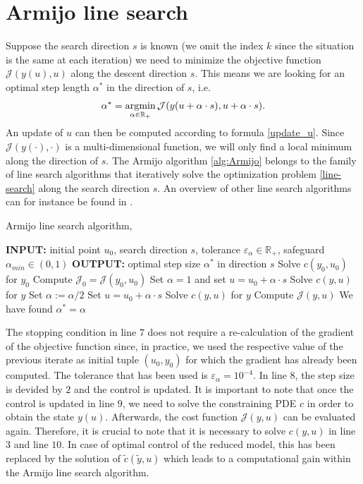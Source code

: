 \section{Armijo line search}
\label{Armapp}
Suppose the search direction $s$ is known (we omit the index $k$ since the situation is the same at each iteration) we need to minimize the objective function $\mathcal{J}(y(u),u)$ along the descent direction $s$. This means we are looking for an optimal step length $\alpha^*$ in the direction of $s$, i.e.
\begin{align}
\label{line-search}
\alpha^* = \operatorname*{\arg\!\min}_{\alpha \in \mathbb{R}_+} \mathcal{J}(y(u + \alpha \cdot s), u + \alpha \cdot s).
\end{align}
An update of $u$ can then be computed according to formula \eqref{update_u}. Since $\mathcal{J}(y(\cdot),\cdot)$ is a multi-dimensional function, we will only find a local minimum along the direction of $s$. The Armijo algorithm \ref{alg:Armijo} belongs to the family of line search algorithms that iteratively solve the optimization problem \eqref{line-search} along the search direction $s$. An overview of other line search algorithms can for instance be found in \cite{Rao09,Bart}.
\begin{algorithm}[H]
\caption{Armijo line search algorithm, \cite{Rao09}}
\label{alg:Armijo}
\begin{algorithmic}[1]
\STATE \textbf{INPUT: } initial point $u_0$, search direction $s$, tolerance $\varepsilon_\alpha \in \mathbb{R}_+$, safeguard $\alpha_{min} \in (0,1)$
\STATE \textbf{OUTPUT: } optimal step size $\alpha^*$ in direction $s$
\STATE Solve $c(y_0,u_0)$ for $y_0$
\STATE Compute $\mathcal{J}_0 = \mathcal{J}(y_0,u_0)$
\STATE Set $\alpha = 1$ and set $u = u_0 + \alpha \cdot s$
\STATE Solve $c(y,u)$ for $y$
\STATE Set $\alpha := \alpha/2$
\STATE Set $u = u_0 + \alpha \cdot s$
\STATE Solve $c(y,u)$ for $y$
\STATE Compute $\mathcal{J}(y,u)$
\ENDWHILE
\STATE We have found $\alpha^* = \alpha$
\end{algorithmic}
\end{algorithm}
The stopping condition in line $7$ does not require a re-calculation of the gradient of the objective function since, in practice, we used the respective value of the previous iterate as initial tuple $(u_0, y_0)$ for which the gradient has already been computed. The tolerance that has been used is $\varepsilon_\alpha = 10^{-4}$. In line $8$, the step size is devided by $2$ and the control is updated. It is important to note that once the control is updated in line $9$, we need to solve the constraining PDE $c$ in order to obtain the state $y(u)$. Afterwards, the cost function $\mathcal{J}(y,u)$ can be evaluated again. Therefore, it is crucial to note that it is necessary to solve $c(y,u)$ in line $3$ and line $10$. In case of optimal control of the reduced model, this has been replaced by the solution of $\tilde{c}(\tilde{y}, u)$ which leads to a computational gain within the Armijo line search algorithm.
\newpage
